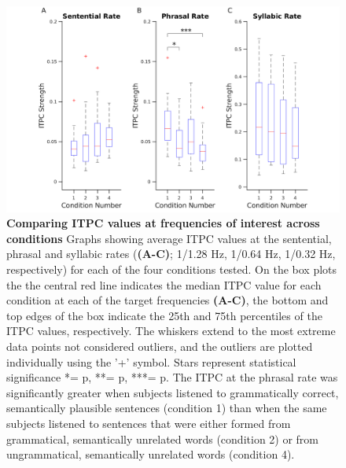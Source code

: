 \documentclass[a4paper,10pt,twoside]{article}
\begin{document}
\begin{figure}[tbhp]
\includegraphics[width=\linewidth]{ITPC_peaks_per_condition.png}
\caption{\textbf{Comparing ITPC values at frequencies of interest
    across conditions} Graphs showing average ITPC values at the
  sentential, phrasal and syllabic rates (\textbf{(A-C)}; 1/1.28 Hz,
  1/0.64 Hz, 1/0.32 Hz, respectively) for each of the four conditions
  tested. On the box plots the the central red line indicates the
  median ITPC value for each condition at each of the target
  frequencies \textbf{(A-C)}, the bottom and top edges of the box
  indicate the 25th and 75th percentiles of the ITPC values,
  respectively. The whiskers extend to the most extreme data points
  not considered outliers, and the outliers are plotted individually
  using the '+' symbol. Stars represent statistical significance *=
  p, **= p, ***= p. The ITPC at the phrasal rate was
  significantly greater when subjects listened to grammatically
  correct, semantically plausible sentences (condition 1) than when the same
  subjects listened to sentences that were either formed from grammatical,
  semantically unrelated words (condition 2) or from ungrammatical,
  semantically unrelated words (condition 4).}
\label{ITPC_peaks}
\end{figure}




\end{document}

